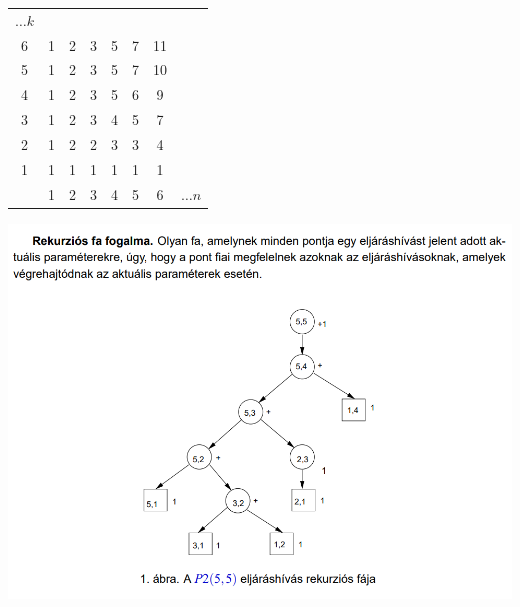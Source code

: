 \documentclass{article}
\theoremstyle{mytheoremstyle}
\theoremstyle{mytheoremstyle}
\theoremstyle{myproblemstyle}
\begin{document}
\begin{center}
    \begin{tabular}{c|ccccccc}
        $\ldots k$\\
        6&1&2&3&5&7&11\\
        5&1&2&3&5&7&10\\
        4&1&2&3&5&6&9\\
        3&1&2&3&4&5&7\\
        2&1&2&2&3&3&4\\
        1&1&1&1&1&1&1\\
        \midrule&1&2&3&4&5&6& $\ldots n$ \\
    \end{tabular}
\end{center}
\begin{center}
    \includegraphics[height=10cm]{rekfa.png}
\end{center}
\end{document}
